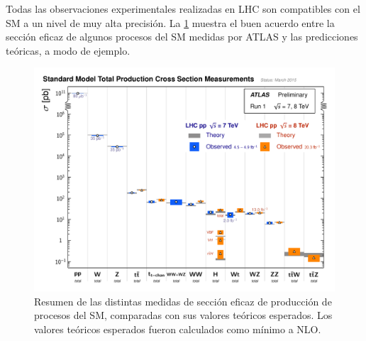 

Todas las observaciones experimentales realizadas en LHC son compatibles con el SM a un nivel de
muy alta precisión.
La \cref{fig:sm_atlas_xs} muestra el buen acuerdo entre la
sección eficaz de algunos procesos del SM medidas por ATLAS y las predicciones
teóricas, a modo de ejemplo.

\begin{figure}[!htb]
  \centering
  \includegraphics[width=1\textwidth]{figures/ATLAS_a_SMSummary_TotalXsect.pdf}
  \caption{Resumen de las distintas medidas de sección eficaz de producción de
    procesos del SM, comparadas con sus valores teóricos esperados.
    Los valores teóricos esperados fueron calculados como mínimo a NLO\cite{ATLASSM}.}
  \label{fig:sm_atlas_xs}
\end{figure}



